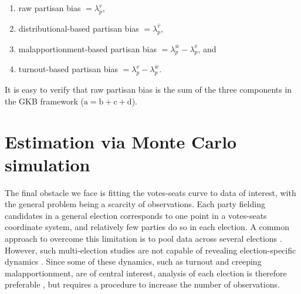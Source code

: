 \documentclass[letter,12pt]{article}
\begin{document}
\begin{enumerate}
\renewcommand{\theenumi}{\alph{enumi}}
\item raw partisan bias $=\lambda_p^v$,
\item distributional-based partisan bias $=\lambda_p^{\bar{v}}$, 
\item malapportionment-based partisan bias $=\lambda_p^{\bar{w}}-\lambda_p^{\bar{v}}$, and
\item turnout-based partisan bias $=\lambda_p^v-\lambda_p^{\bar{w}}$.
\end{enumerate}

\noindent It is easy to verify that raw partisan bias is the sum of the three components in the GKB framework ($\text{a}=\text{b}+\text{c}+\text{d}$). 

\section{Estimation via Monte Carlo simulation}

The final obstacle we face is fitting the votes-seats curve to data of interest, with the general problem being a scarcity of observations. Each party fielding candidates in a general election corresponds to one point in a votes-seats coordinate system, and relatively few parties do so in each election. A common approach to overcome this limitation is to pool data across several elections \citep[e.g.,][]{marquez2014biasBlog}. However, such multi-election studies are not capable of revealing election-specific dynamics \citep{jackmanMeasuringBias1994}. Since some of these dynamics, such as turnout and creeping malapportionment, are of central interest, analysis of each election is therefore preferable \citep{niemi.fett1986swing}, but requires a procedure to increase the number of observations.
\end{document}
